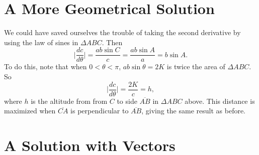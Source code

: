 \documentclass{ximera}
\begin{document}
\section*{A More Geometrical Solution}
We could have saved ourselves the trouble of taking the second derivative by using the law of sines in $\Delta ABC$. Then %
\[
    \Big| \frac{dc}{d\theta}  \Big| =   \frac{ab\sin C}{c}  = \frac{ab \sin A}{a} = b\sin A .
\]
To do this, note that when $0<\theta < \pi$, $ab\sin\theta = 2K$ is twice the area of $\Delta ABC$. So
\[
     \Big| \frac{dc}{d\theta} \Big| = \frac{2K}{c}  = h,
\]
where $h$ is the altitude from from $C$ to side $\overline{AB}$ in $\Delta ABC$ above. This distance is maximized when $\overline{CA}$ is perpendicular to $\overline{AB}$, giving the same result as before. 


\section*{A Solution with Vectors}
\end{document}

